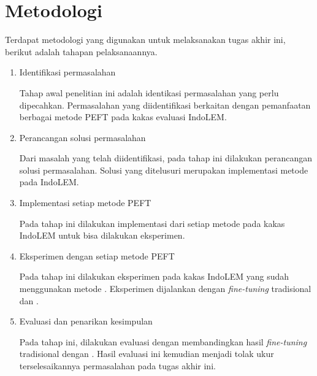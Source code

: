 \section{Metodologi}

Terdapat metodologi yang digunakan untuk melaksanakan tugas akhir ini, berikut adalah tahapan pelaksanaannya.

\begin{enumerate}
    \item Identifikasi permasalahan

    Tahap awal penelitian ini adalah identikasi permasalahan yang perlu dipecahkan. Permasalahan yang diidentifikasi berkaitan dengan pemanfaatan berbagai metode PEFT pada kakas evaluasi IndoLEM.

    \item Perancangan solusi permasalahan

    Dari masalah yang telah diidentifikasi, pada tahap ini dilakukan perancangan solusi permasalahan. Solusi yang ditelusuri merupakan implementasi metode \PEFT pada IndoLEM.

    \item Implementasi setiap metode PEFT

    Pada tahap ini dilakukan implementasi dari setiap metode \PEFT pada kakas IndoLEM untuk bisa dilakukan eksperimen.

    \item Eksperimen dengan setiap metode PEFT

    Pada tahap ini dilakukan eksperimen pada kakas IndoLEM yang sudah menggunakan metode \PEFT. Eksperimen  dijalankan dengan \textit{fine-tuning} tradisional dan \PEFT.

    \item Evaluasi dan penarikan kesimpulan

    Pada tahap ini, dilakukan evaluasi dengan membandingkan hasil \textit{fine-tuning} tradisional dengan \PEFT. Hasil evaluasi ini kemudian  menjadi tolak ukur terselesaikannya permasalahan pada tugas akhir ini.

\end{enumerate}
